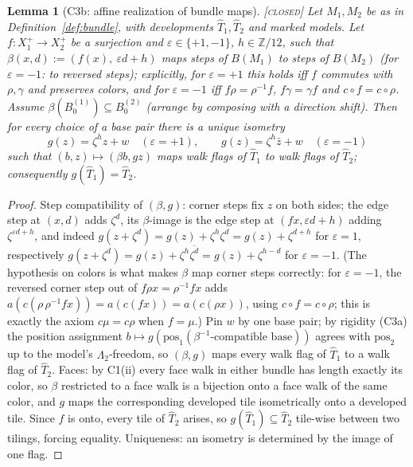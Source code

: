 \documentclass[11pt]{article}
\newtheorem{lemma}[theorem]{Lemma}
\theoremstyle{definition}
\newcommand{\CLOSED}{\textnormal{\textsc{[closed]}}}
\newcommand{\Z}{\mathbb{Z}}
\begin{document}
\begin{lemma}[C3b: affine realization of bundle maps]\label{lem:C3b} \CLOSED\;
Let $M_1, M_2$ be as in Definition~\ref{def:bundle}, with developments
$\hat T_1, \hat T_2$ and marked models. Let $f : X_1^+ \to X_2^+$ be a surjection and
$\varepsilon \in \{+1, -1\}$, $h \in \Z/12$, such that
$\beta(x,d) := (f(x),\ \varepsilon d + h)$ maps steps of $B(M_1)$ to steps of $B(M_2)$
(for $\varepsilon = -1$: to reversed steps); explicitly, for $\varepsilon = +1$ this
holds iff $f$ commutes with $\rho, \gamma$ and preserves colors, and for
$\varepsilon = -1$ iff $f\rho = \rho^{-1}f$, $f\gamma = \gamma f$ and
$c \circ f = c \circ \rho$. Assume $\beta(B_0^{(1)}) \subseteq B_0^{(2)}$ (arrange by
composing with a direction shift). Then for every choice of a base pair there is a
unique isometry
\[
g(z) = \zeta^h z + w \quad (\varepsilon = +1), \qquad
g(z) = \zeta^h \bar z + w \quad (\varepsilon = -1)
\]
such that $(b, z) \mapsto (\beta b, g z)$ maps walk flags of $\hat T_1$ to walk flags of
$\hat T_2$; consequently $g(\hat T_1) = \hat T_2$.
\end{lemma}

\begin{proof}
Step compatibility of $(\beta, g)$: corner steps fix $z$ on both sides; the edge step at
$(x,d)$ adds $\zeta^d$, its $\beta$-image is the edge step at $(f x, \varepsilon d + h)$
adding $\zeta^{\varepsilon d + h}$, and indeed
$g(z + \zeta^d) = g(z) + \zeta^{h}\zeta^{d} = g(z) + \zeta^{d+h}$ for
$\varepsilon = 1$, respectively
$g(z + \zeta^d) = g(z) + \zeta^h \overline{\zeta^{d}} = g(z) + \zeta^{h-d}$ for
$\varepsilon = -1$. (The hypothesis on colors is what makes $\beta$ map corner steps
correctly: for $\varepsilon = -1$, the reversed corner step out of $f\rho x = \rho^{-1}fx$
adds $a(c(\rho\,\rho^{-1}fx)) = a(c(fx)) = a(c(\rho x))$, using
$c \circ f = c \circ \rho$; this is exactly the axiom $c\mu = c\rho$ when $f = \mu$.)
Pin $w$ by one base pair; by rigidity (C3a) the position assignment
$b \mapsto g(\mathrm{pos}_1(\beta^{-1}\text{-compatible base}))$ agrees with
$\mathrm{pos}_2$ up to the model's $\Lambda_2$-freedom, so $(\beta, g)$ maps every walk
flag of $\hat T_1$ to a walk flag of $\hat T_2$. Faces: by C1(ii) every face walk in
either bundle has length exactly its color, so $\beta$ restricted to a face walk is a
bijection onto a face walk of the same color, and $g$ maps the corresponding developed
tile isometrically onto a developed tile. Since $f$ is onto, every tile of $\hat T_2$
arises, so $g(\hat T_1) \subseteq \hat T_2$ tile-wise between two tilings, forcing
equality. Uniqueness: an isometry is determined by the image of one flag.
\end{proof}
\end{document}
